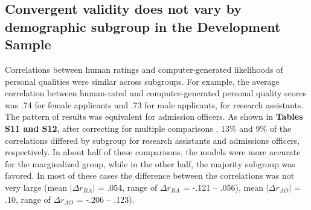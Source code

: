 \documentclass[11pt]{report}
\begin{document}
\begin{mainf}
\subsection{Convergent validity does not vary by demographic subgroup in the Development Sample}

Correlations between human ratings and computer-generated likelihoods of personal qualities were similar across subgroups. For example, the average correlation between human-rated and computer-generated personal quality scores was .74 for female applicants and .73 for male applicants, for research assistants. The pattern of results was equivalent for admission officers. As shown in \textbf{Tables S11 and S12}, after correcting for multiple comparisons \cite{benjamini_control_2001}, 13\% and 9\% of the correlations differed by subgroup for research assistants and admissions officers, respectively. In about half of these comparisons, the models were more accurate for the marginalized group, while in the other half, the majority subgroup was favored. In most of these cases the difference between the correlations was not very large (mean $|\Delta r_{RA}|$ = .054, range of $\Delta r_{RA}$ = -.121 -- .056), mean $|\Delta r_{AO}|$ = .10, range of $\Delta r_{AO}$ = -.206 -- .123).


\end{mainf}
\end{document}
